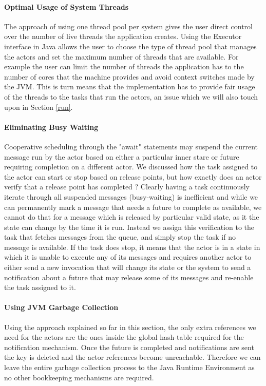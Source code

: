 \paragraph{Optimal Usage of System Threads}
The approach of using one thread pool per system gives the user direct control over the number of live threads the application creates. Using the Executor interface in Java allows the user to choose the type of thread pool that manages the actors and set the maximum number of threads that are available. For example the user can limit the number of threads the application has to the number of cores that the machine provides and avoid context switches made by the JVM. This is turn means that the implementation has to provide fair usage of the threads to the tasks that run the actors, an issue which we will also touch upon in Section \ref{run}.  

\paragraph{Eliminating Busy Waiting}
Cooperative scheduling through the "await" statements may suspend the current message run by the actor based on either a particular inner stare or future requiring completion on a different actor. We discussed how the task assigned to the actor can start or stop based on release points, but how exactly does an actor verify that a release point has completed ? Clearly having a task continuously iterate through all suspended messages (busy-waiting) is inefficient and while we can permanently mark a message that needs a future to complete as available, we cannot do that for a message which is released by particular valid state, as it the state can change by the time it is run. Instead we assign this verification to the task that fetches messages from the queue, and simply stop the task if no message is available. If the task does stop, it means that the actor is in a state in which it is unable to execute any of its messages and requires another actor to either send a new invocation that will change its state or the system to send a notification about a future that may release some of its messages and re-enable the task assigned to it.  


\paragraph{Using JVM Garbage Collection}
Using the approach explained so far in this section, the only extra references we need for the actors are the ones inside the global hash-table required for the notification mechanism. Once the future is completed and notifications are sent the key is deleted and the actor references become unreachable. Therefore we can leave the entire garbage collection process to the Java Runtime Environment as no other bookkeeping mechanisms are required.

